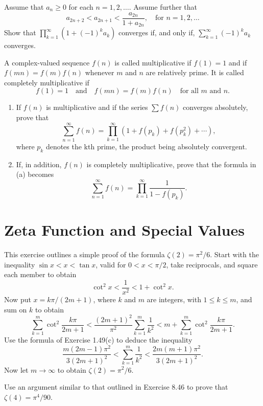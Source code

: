 \begin{problembox}
Assume that \(a_n \geq 0\) for each \(n = 1, 2, \ldots\). Assume further that
\[a_{2n+2} < a_{2n+1} < \frac{a_{2n}}{1 + a_{2n}}, \quad \text{for } n = 1, 2, \ldots\]
Show that \(\prod_{k=1}^{\infty} (1 + (-1)^k a_k)\) converges if, and only if, \(\sum_{k=1}^{\infty} (-1)^k a_k\) converges.
\end{problembox}

\begin{problembox}
A complex-valued sequence \(f(n)\) is called multiplicative if \(f(1) = 1\) and if \(f(mn) = f(m)f(n)\) whenever \(m\) and \(n\) are relatively prime. It is called completely multiplicative if
\[f(1) = 1 \quad \text{and} \quad f(mn) = f(m)f(n) \quad \text{for all } m \text{ and } n.\]
\begin{enumerate}[label=\alph*)]
\item If \(f(n)\) is multiplicative and if the series \(\sum f(n)\) converges absolutely, prove that
\[\sum_{n=1}^{\infty} f(n) = \prod_{k=1}^{\infty} (1 + f(p_k) + f(p_k^2) + \cdots),\]
where \(p_k\) denotes the kth prime, the product being absolutely convergent.
\item If, in addition, \(f(n)\) is completely multiplicative, prove that the formula in (a) becomes
\[\sum_{n=1}^{\infty} f(n) = \prod_{k=1}^{\infty} \frac{1}{1 - f(p_k)}.\]
\end{enumerate}
\end{problembox}

\section{Zeta Function and Special Values}

\begin{problembox}
This exercise outlines a simple proof of the formula \(\zeta(2) = \pi^2/6\). Start with the inequality \(\sin x < x < \tan x\), valid for \(0 < x < \pi/2\), take reciprocals, and square each member to obtain
\[\cot^2 x < \frac{1}{x^2} < 1 + \cot^2 x.\]
Now put \(x = k\pi/(2m + 1)\), where \(k\) and \(m\) are integers, with \(1 \leq k \leq m\), and sum on \(k\) to obtain
\[\sum_{k=1}^{m} \cot^2 \frac{k\pi}{2m + 1} < \frac{(2m + 1)^2}{\pi^2} \sum_{k=1}^{m} \frac{1}{k^2} < m + \sum_{k=1}^{m} \cot^2 \frac{k\pi}{2m + 1}.\]
Use the formula of Exercise 1.49(c) to deduce the inequality
\[\frac{m(2m - 1)\pi^2}{3(2m + 1)^2} < \sum_{k=1}^m \frac{1}{k^2} < \frac{2m(m + 1)\pi^2}{3(2m + 1)^2}.\]
Now let \(m \to \infty\) to obtain \(\zeta(2) = \pi^2/6\).
\end{problembox}

\begin{problembox}
Use an argument similar to that outlined in Exercise 8.46 to prove that \(\zeta(4) = \pi^4/90\).
\end{problembox}